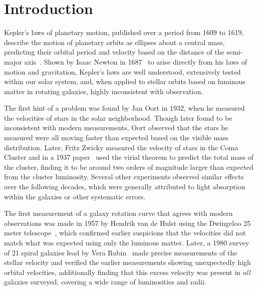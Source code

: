 \chapter{Introduction}
\label{intro_chapter}

Kepler's laws of planetary motion, published over a period from 1609 to 1619, describe the motion of planetary orbits as ellipses about a central mass, predicting their orbital period and velocity based on the distance of the semi-major axis~\cite{kepler, russell}.
Shown by Isaac Newton in 1687~\cite{newton} to arise directly from his laws of motion and gravitation, Kepler's laws are well understood, extensively tested within our solar system, and, when applied to stellar orbits based on luminous matter in rotating galaxies, highly inconsistent with observation.

The first hint of a problem was found by Jan Oort in 1932, when he measured the velocities of stars in the solar neighborhood. 
Though later found to be inconsistent with modern measurements, Oort observed that the stars he measured were all moving faster than expected based on the visible mass distribution.
Later, Fritz Zwicky measured the velocity of stars in the Coma Cluster and in a 1937 paper~\cite{Zwicky} used the virial theorem to predict the total mass of the cluster, finding it to be around two orders of magnitude larger than expected from the cluster luminosity. 
Several other experiments observed similar effects over the following decades, which were generally attributed to light absorption within the galaxies or other systematic errors.

The first measurement of a galaxy rotation curve that agrees with modern observations was made in 1957 by Hendrik van de Hulst using the Dwingeloo 25 meter telescope~\cite{deHulst}, which confirmed earlier suspicions that the velocities did not match what was expected using only the luminous matter.
Later, a 1980 survey of 21 spiral galaxies lead by Vera Rubin~\cite{RubinSurvey} made precise measurements of the stellar velocity and verified the earlier measurements showing unexpectedly high orbital velocities, additionally finding that this excess velocity was present in \textit{all} galaxies surveyed, covering a wide range of luminosities and radii.


